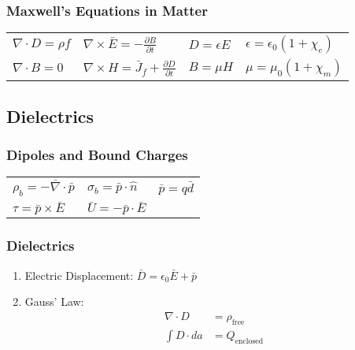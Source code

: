 \documentclass[10pt,a4paper]{article}
\begin{document}
\subsubsection{Maxwell's Equations in Matter}
\begin{tabular}{l l l l}
    $\nabla \cdot D = \rho f$ & $\nabla \times \bar{E} = -\frac{\partial B}{\partial t}$ & $D = \epsilon E$ & $\epsilon = \epsilon_0(1 + \chi_e)$\\
    $\nabla \cdot B = 0$ & $\nabla \times H = \bar{J}_f + \frac{\partial D}{\partial t}$ & $B = \mu H$ & $\mu = \mu_0(1  +\chi_m)$
\end{tabular}

\subsection{Dielectrics}
\subsubsection{Dipoles and Bound Charges}
\begin{tabular}{l l l}
$\rho_b = - \overline{\nabla} \cdot \bar{p}$ & $\sigma_b = \bar{p} \cdot \hat{n}$ & $\bar{p} = q \bar{d}$\\
$\tau = \bar{p} \times \bar{E} $ & $\bar{U} = -\bar{p} \cdot \bar{E}$ & 
\end{tabular}

\subsubsection{Dielectrics}
\begin{enumerate}
    \item Electric Displacement: $\bar{D} = \epsilon_0 \bar{E} + \bar{p}$
    \item Gauss' Law: \\
    \begin{align}
      \nabla \cdot D &= \rho_\textrm{free}\\
      \int D \cdot da &= Q_{\textrm{enclosed}}
    \end{align}
\end{enumerate}
\end{document}

